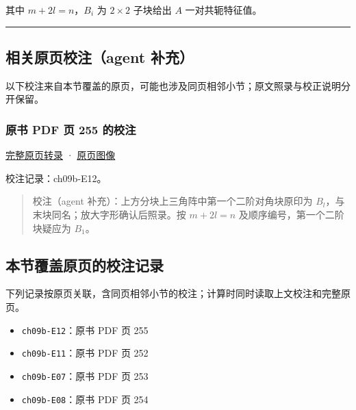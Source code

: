 \documentclass[
  10pt,
  fontset=fandol]{ctexart}
\providecommand{\tightlist}{%
  \setlength{\itemsep}{0pt}\setlength{\parskip}{0pt}}
\begin{document}
其中 \(m+2l=n\)，\(B_i\) 为 \(2\times2\) 子块给出 \(A\) 一对共轭特征值。

\begin{center}\rule{0.5\linewidth}{0.5pt}\end{center}

\subsection{相关原页校注（agent 补充）}\label{ux76f8ux5173ux539fux9875ux6821ux6ce8agent-ux8865ux5145}

以下校注来自本节覆盖的原页，可能也涉及同页相邻小节；原文照录与校正说明分开保留。

\subsubsection{原书 PDF 页 255 的校注}\label{ux539fux4e66-pdf-ux9875-255-ux7684ux6821ux6ce8}

\href{../pages/pdf-255.md}{完整原页转录} · \href{../../source-images/pdf-255.jpeg}{原页图像}

校注记录：ch09b-E12。

\begin{quote}
校注（agent 补充）：上方分块上三角阵中第一个二阶对角块原印为 \(B_l\)，与末块同名；放大字形确认后照录。按 \(m+2l=n\) 及顺序编号，第一个二阶块疑应为 \(B_1\)。
\end{quote}

\subsection{本节覆盖原页的校注记录}\label{ux672cux8282ux8986ux76d6ux539fux9875ux7684ux6821ux6ce8ux8bb0ux5f55}

下列记录按原页关联，含同页相邻小节的校注；计算时同时读取上文校注和完整原页。

\begin{itemize}
\tightlist
\item
  \texttt{ch09b-E12}：原书 PDF 页 255
\item
  \texttt{ch09b-E11}：原书 PDF 页 252
\item
  \texttt{ch09b-E07}：原书 PDF 页 253
\item
  \texttt{ch09b-E08}：原书 PDF 页 254
\end{itemize}
\end{document}

